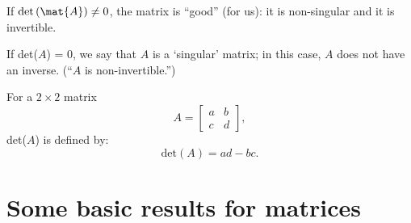 \documentclass[12pt]{article}
\begin{document}
If $\det{(\mat{A})} \ne 0$, the matrix is ``good'' (for us):
it is non-singular and it is invertible.

If det($A$) = 0, we say that $A$ is a `singular' matrix; in this case, $A$ does
not have an inverse. (``$A$ is non-invertible.'')

For a $2 \times 2$ matrix 
$$A = \left[ \begin{array}{cc}  a & b \\ c & d  \end{array} \right],$$
det($A$) is defined by:
$${\mbox{det}}(A) = ad - bc.$$



\section{Some basic results for matrices}
\end{document}
